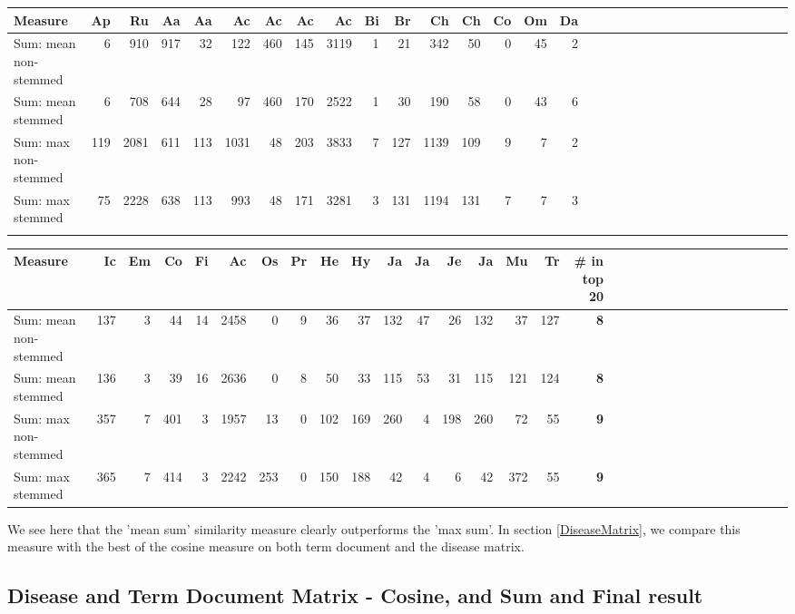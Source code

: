 \begin{table}[H]
\begin{tiny}
  \begin{tabular}{|l|r|r|r|r|r|r|r|r|r|r|r|r|r|r|r|r|r|r|r|r|r|r|r|r|r|r|r|r|r|r|r|}
    \hline
    Measure &Ap&Ru&Aa&Aa&Ac&Ac&Ac&Ac&Bi&Br&Ch&Ch&Co&Om&Da\\
    \hline
    Sum: mean non-stemmed &6&910&917&32&122&460&145&3119&1&21&342&50&0&45&2\\
    \hline
    Sum: mean stemmed &6&708&644&28&97&460&170&2522&1&30&190&58&0&43&6\\
    \hline
    Sum: max non-stemmed &119&2081&611&113&1031&48&203&3833&7&127&1139&109&9&7&2\\
    \hline
    Sum: max stemmed &75&2228&638&113&993&48&171&3281&3&131&1194&131&7&7&3 \\
    \hline
    \multicolumn{16}{c}{} \\
    \end{tabular}
    \begin{tabular}{|l|r|r|r|r|r|r|r|r|r|r|r|r|r|r|r|r|r|r|r|r|r|r|r|r|r|r|r|r|r|r|}
    \hline
     Measure &Ic&Em&Co&Fi&Ac&Os&Pr&He&Hy&Ja&Ja&Je&Ja&Mu&Tr &\scriptsize{\textbf{\# in top 20}} \\
    \hline
    Sum: mean non-stemmed &137&3&44&14&2458&0&9&36&37&132&47&26&132&37&127 & \scriptsize{\textbf{8}} \\
    \hline
    Sum: mean stemmed &136&3&39&16&2636&0&8&50&33&115&53&31&115&121&124 & \scriptsize{\textbf{8}} \\
    \hline
    Sum: max non-stemmed &357&7&401&3&1957&13&0&102&169&260&4&198&260&72&55 & \scriptsize{\textbf{9}} \\
    \hline
    Sum: max stemmed &365&7&414&3&2242&253&0&150&188&42&4&6&42&372&55 & \scriptsize{\textbf{9}} \\
    \hline
  \end{tabular}
\end{tiny}
\end{table}

We see here that the 'mean sum' similarity measure clearly outperforms the 'max sum'. 
In section \ref{DiseaseMatrix}, we compare this measure with the best of the cosine 
measure on both term document and the disease matrix.

\subsection{Disease and Term Document Matrix - Cosine, and Sum and Final result}

